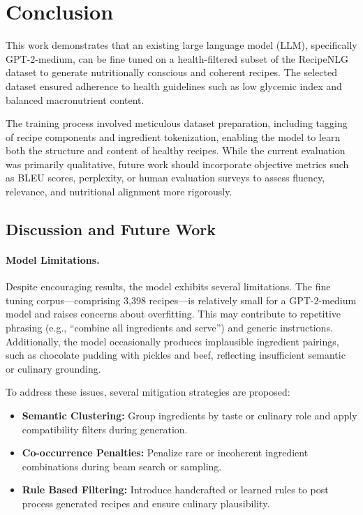 \section{Conclusion}

This work demonstrates that an existing large language model (LLM), specifically GPT-2-medium, can be fine tuned on a health-filtered subset of the RecipeNLG dataset to generate nutritionally conscious and coherent recipes. The selected dataset ensured adherence to health guidelines such as low glycemic index and balanced macronutrient content.

The training process involved meticulous dataset preparation, including tagging of recipe components and ingredient tokenization, enabling the model to learn both the structure and content of healthy recipes. While the current evaluation was primarily qualitative, future work should incorporate objective metrics such as BLEU scores, perplexity, or human evaluation surveys to assess fluency, relevance, and nutritional alignment more rigorously.

\subsection{Discussion and Future Work}

\paragraph{Model Limitations.}
Despite encouraging results, the model exhibits several limitations. The fine tuning corpus—comprising 3,398 recipes—is relatively small for a GPT-2-medium model and raises concerns about overfitting. This may contribute to repetitive phrasing (e.g., ``combine all ingredients and serve'') and generic instructions. Additionally, the model occasionally produces implausible ingredient pairings, such as chocolate pudding with pickles and beef, reflecting insufficient semantic or culinary grounding.

To address these issues, several mitigation strategies are proposed:
\begin{itemize}
    \item \textbf{Semantic Clustering:} Group ingredients by taste or culinary role and apply compatibility filters during generation.
    \item \textbf{Co-occurrence Penalties:} Penalize rare or incoherent ingredient combinations during beam search or sampling.
    \item \textbf{Rule Based Filtering:} Introduce handcrafted or learned rules to post process generated recipes and ensure culinary plausibility.
\end{itemize}

